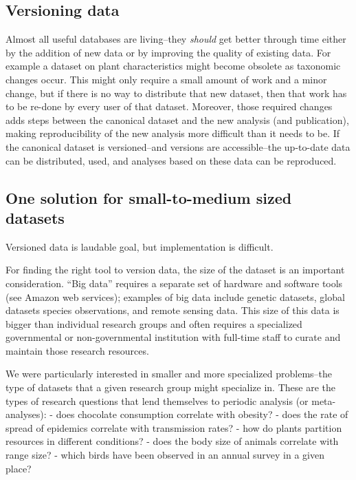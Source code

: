 \documentclass[a4paper,11pt]{article}
\begin{document}
\subsection{Versioning data}

Almost all useful databases are living--they \emph{should} get better
through time either by the addition of new data or by improving the
quality of existing data. For example a dataset on plant characteristics
might become obsolete as taxonomic changes occur. This might only
require a small amount of work and a minor change, but if there is no
way to distribute that new dataset, then that work has to be re-done by
every user of that dataset. Moreover, those required changes adds steps
between the canonical dataset and the new analysis (and publication),
making reproducibility of the new analysis more difficult than it needs
to be. If the canonical dataset is versioned--and versions are
accessible--the up-to-date data can be distributed, used, and analyses
based on these data can be reproduced.

\subsection{One solution for small-to-medium sized
datasets}

Versioned data is laudable goal, but implementation is difficult.

For finding the right tool to version data, the size of the dataset is
an important consideration. ``Big data'' requires a separate set of
hardware and software tools (see Amazon web services); examples of big
data include genetic datasets, global datasets species observations, and
remote sensing data. This size of this data is bigger than individual
research groups and often requires a specialized governmental or
non-governmental institution with full-time staff to curate and maintain
those research resources.

We were particularly interested in smaller and more specialized
problems--the type of datasets that a given research group might
specialize in. These are the types of research questions that lend
themselves to periodic analysis (or meta-analyses): - does chocolate
consumption correlate with obesity? - does the rate of spread of
epidemics correlate with transmission rates? - how do plants partition
resources in different conditions? - does the body size of animals
correlate with range size? - which birds have been observed in an annual
survey in a given place?
\end{document}
